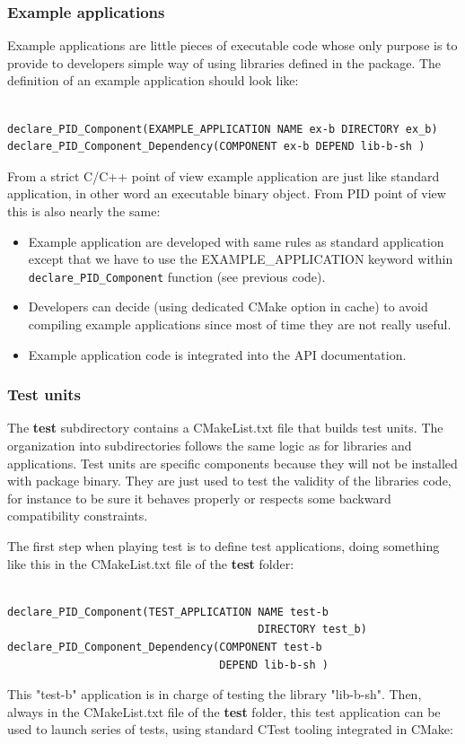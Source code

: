 \documentclass[12pt,a4paper]{article}
\begin{document}
\subsubsection{Example applications}
\label{sec:appCMakeExample}

Example applications are little pieces of executable code whose only purpose is to provide to developers simple way of using libraries defined in the package. The definition of an example application  should look like:
\begin{verbatim}

declare_PID_Component(EXAMPLE_APPLICATION NAME ex-b DIRECTORY ex_b)
declare_PID_Component_Dependency(COMPONENT ex-b DEPEND lib-b-sh )

\end{verbatim}

From a strict C/C++ point of view example application are just like standard application, in other word an executable binary object. From PID point of view this is also nearly the same:
\begin{itemize}
\item Example application are developed with same rules as standard application except that we have to use the EXAMPLE\_APPLICATION keyword within \texttt{declare\_PID\_Component} function (see previous code).
\item Developers can decide (using dedicated CMake option in cache) to avoid compiling example applications since most of time they are not really useful.
\item Example application code is integrated into the API documentation.
\end{itemize}

\subsubsection{Test units}
\label{sec:testCMake}

The \textbf{test} subdirectory contains a CMakeList.txt file that builds test units. The organization into subdirectories follows the same logic as for libraries and applications. Test units are specific components because they will not be installed with package binary. They are just used to test the validity of the libraries code, for instance  to be sure it behaves properly or respects some backward compatibility constraints. 

The first step when playing test is to define test applications, doing something like this in the CMakeList.txt file of the \textbf{test} folder:
\begin{verbatim}

declare_PID_Component(TEST_APPLICATION NAME test-b 
                                       DIRECTORY test_b)
declare_PID_Component_Dependency(COMPONENT test-b 
                                 DEPEND lib-b-sh )

\end{verbatim}
This "test-b" application is in charge of testing the library "lib-b-sh". Then, always in the CMakeList.txt file of the \textbf{test} folder, this test application can be used to launch series of tests, using standard CTest tooling integrated in CMake:
\end{document}
